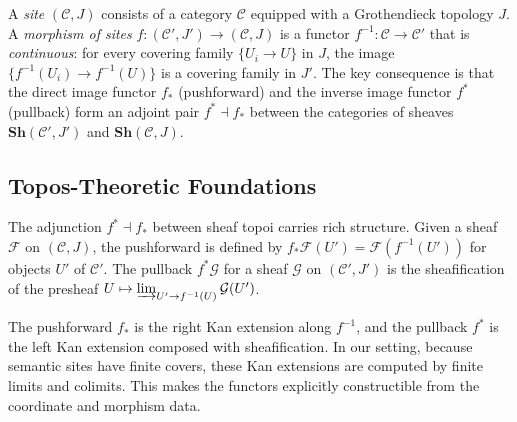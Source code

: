 \documentclass[11pt]{article}
\begin{document}
A \emph{site} $(\mathcal{C}, J)$ consists of a category $\mathcal{C}$
equipped with a Grothendieck topology $J$.  A \emph{morphism of sites}
$f : (\mathcal{C}', J') \to (\mathcal{C}, J)$ is a functor
$f^{-1} : \mathcal{C} \to \mathcal{C}'$ that is \emph{continuous}: for
every covering family $\{U_i \to U\}$ in $J$, the image
$\{f^{-1}(U_i) \to f^{-1}(U)\}$ is a covering family in $J'$.  The
key consequence is that the direct image functor $f_*$ (pushforward) and
the inverse image functor $f^*$ (pullback) form an adjoint pair
$f^* \dashv f_*$ between the categories of sheaves
$\mathbf{Sh}(\mathcal{C}', J')$ and $\mathbf{Sh}(\mathcal{C}, J)$.

\subsection{Topos-Theoretic Foundations}\label{sec:topos-foundations}

The adjunction $f^* \dashv f_*$ between sheaf topoi carries rich
structure.  Given a sheaf $\mathcal{F}$ on $(\mathcal{C}, J)$, the
pushforward is defined by $f_*\mathcal{F}(U') = \mathcal{F}(f^{-1}(U'))$
for objects $U'$ of $\mathcal{C}'$.  The pullback $f^*\mathcal{G}$ for a
sheaf $\mathcal{G}$ on $(\mathcal{C}', J')$ is the sheafification of the
presheaf $U \mapsto \varinjlim_{U' \to f^{-1}(U)} \mathcal{G}(U')$.

\begin{remark}\label{rmk:kan-extensions}
The pushforward $f_*$ is the right Kan extension along $f^{-1}$, and the
pullback $f^*$ is the left Kan extension composed with sheafification.
In our setting, because semantic sites have finite covers, these Kan
extensions are computed by finite limits and colimits.  This makes
the functors explicitly constructible from the coordinate and morphism
data.
\end{remark}
\end{document}
